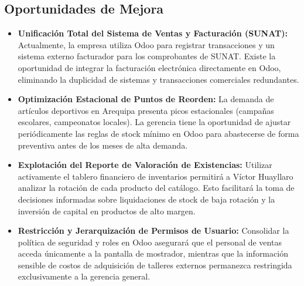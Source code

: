 \subsection{Oportunidades de Mejora}

\begin{itemize}
    \item \textbf{Unificación Total del Sistema de Ventas y Facturación (SUNAT):} Actualmente, la empresa utiliza Odoo para registrar transacciones y un sistema externo facturador para los comprobantes de SUNAT. Existe la oportunidad de integrar la facturación electrónica directamente en Odoo, eliminando la duplicidad de sistemas y transacciones comerciales redundantes.
    \item \textbf{Optimización Estacional de Puntos de Reorden:} La demanda de artículos deportivos en Arequipa presenta picos estacionales (campañas escolares, campeonatos locales). La gerencia tiene la oportunidad de ajustar periódicamente las reglas de stock mínimo en Odoo para abastecerse de forma preventiva antes de los meses de alta demanda.
    \item \textbf{Explotación del Reporte de Valoración de Existencias:} Utilizar activamente el tablero financiero de inventarios permitirá a Víctor Huayllaro analizar la rotación de cada producto del catálogo. Esto facilitará la toma de decisiones informadas sobre liquidaciones de stock de baja rotación y la inversión de capital en productos de alto margen.
    \item \textbf{Restricción y Jerarquización de Permisos de Usuario:} Consolidar la política de seguridad y roles en Odoo asegurará que el personal de ventas acceda únicamente a la pantalla de mostrador, mientras que la información sensible de costos de adquisición de talleres externos permanezca restringida exclusivamente a la gerencia general.
\end{itemize}
